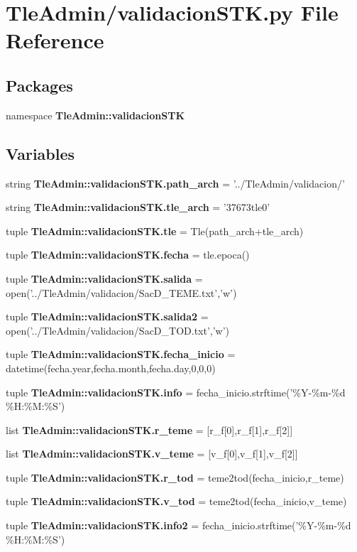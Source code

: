 \section{\-Tle\-Admin/validacion\-S\-T\-K.py \-File \-Reference}
\label{validacion_s_t_k_8py}
\subsection*{\-Packages}
\begin{DoxyCompactItemize}
\item 
namespace {\bf \-Tle\-Admin\-::validacion\-S\-T\-K}
\end{DoxyCompactItemize}
\subsection*{\-Variables}
\begin{DoxyCompactItemize}
\item 
string {\bf \-Tle\-Admin\-::validacion\-S\-T\-K.\-path\-\_\-arch} = '../\-Tle\-Admin/validacion/'
\item 
string {\bf \-Tle\-Admin\-::validacion\-S\-T\-K.\-tle\-\_\-arch} = '37673tle0'
\item 
tuple {\bf \-Tle\-Admin\-::validacion\-S\-T\-K.\-tle} = \-Tle(path\-\_\-arch+tle\-\_\-arch)
\item 
tuple {\bf \-Tle\-Admin\-::validacion\-S\-T\-K.\-fecha} = tle.\-epoca()
\item 
tuple {\bf \-Tle\-Admin\-::validacion\-S\-T\-K.\-salida} = open('../\-Tle\-Admin/validacion/\-Sac\-D\-\_\-\-T\-E\-M\-E.\-txt','w')
\item 
tuple {\bf \-Tle\-Admin\-::validacion\-S\-T\-K.\-salida2} = open('../\-Tle\-Admin/validacion/\-Sac\-D\-\_\-\-T\-O\-D.\-txt','w')
\item 
tuple {\bf \-Tle\-Admin\-::validacion\-S\-T\-K.\-fecha\-\_\-inicio} = datetime(fecha.\-year,fecha.\-month,fecha.\-day,0,0,0)
\item 
tuple {\bf \-Tle\-Admin\-::validacion\-S\-T\-K.\-info} = fecha\-\_\-inicio.\-strftime('\%\-Y-\/\%m-\/\%d \%\-H\-:\%\-M\-:\%\-S')
\item 
list {\bf \-Tle\-Admin\-::validacion\-S\-T\-K.\-r\-\_\-teme} = [r\-\_\-f[0],r\-\_\-f[1],r\-\_\-f[2]]
\item 
list {\bf \-Tle\-Admin\-::validacion\-S\-T\-K.\-v\-\_\-teme} = [v\-\_\-f[0],v\-\_\-f[1],v\-\_\-f[2]]
\item 
tuple {\bf \-Tle\-Admin\-::validacion\-S\-T\-K.\-r\-\_\-tod} = teme2tod(fecha\-\_\-inicio,r\-\_\-teme)
\item 
tuple {\bf \-Tle\-Admin\-::validacion\-S\-T\-K.\-v\-\_\-tod} = teme2tod(fecha\-\_\-inicio,v\-\_\-teme)
\item 
tuple {\bf \-Tle\-Admin\-::validacion\-S\-T\-K.\-info2} = fecha\-\_\-inicio.\-strftime('\%\-Y-\/\%m-\/\%d \%\-H\-:\%\-M\-:\%\-S')
\end{DoxyCompactItemize}

